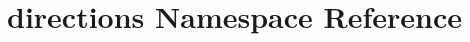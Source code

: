 \hypertarget{namespacedirections}{\section{directions Namespace Reference}
\label{namespacedirections}
}
